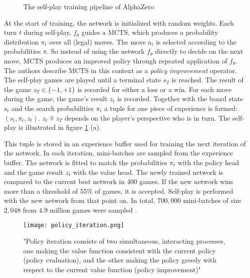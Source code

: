 \begin{figure}[!h]
    \centering
    \caption{The self-play training pipeline of AlphaZero \cite[p. 5]{silver_mastering_2017}}
    \label{alpha_zero_training}
\end{figure}

At the start of training, the network is initialized with random weights. Each turn $t$ during self-play, $f_{\theta}$ guides a MCTS, which produces a probability distribution $\pi_t$ over all (legal) moves. The move $a_t$ is selected according to the probabilities $\pi$. So instead of using the network $f_{\theta}$ directly to decide on the next move, MCTS produces an improved policy through repeated application of $f_{\theta}$. The authors describe MCTS in this context as a \textit{policy improvement} operator. The self-play games are played until a terminal state $s_T$ is reached. The result of the game $z_T \in \{-1, +1\}$ is recorded for either a loss or a win. For each move during the game, the game's result $z_t$ is recorded. Together with the board state $s_t$ and the search probabilities $\pi_t$ a tuple for one piece of experience is formed: $(s_t, \pi_t, z_t)$. $z_t \mp z_T $ depends on the player's perspective who is in turn. The self-play is illustrated in figure \ref{alpha_zero_training} (a).

This tuple is stored in an experience buffer used for training the next iteration of the network. In each iteration, mini-batches are sampled from the experience buffer. The network is fitted to match the probabilities $\pi_t$ with the policy head and the game result $z_t$ with the value head. The newly trained network is compared to the current best network in 400 games. If the new network wins more than a threshold of 55\% of games, it is accepted. Self-play is performed with the new network from that point on. In total, $700,000$ mini-batches of size $2,048$ from $4.9$ million games were sampled \cite[p. 6]{silver_mastering_2017}.

\begin{figure}
    \centering
    \texttt{[image: policy\_iteration.png]}
    \caption{"Policy iteration consists of two simultaneous, interacting processes, one making the value function consistent with the current policy (policy evaluation), and the other making the policy greedy with respect to the current value function (policy improvement)" \cite[86]{sutton_reinforcement_2018}}
    \label{policy_iteration}
\end{figure}

